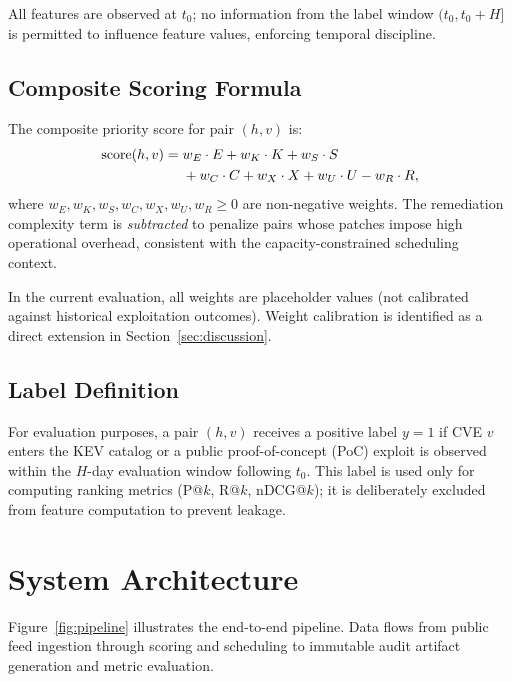\documentclass[journal]{IEEEtran}
\begin{document}
All features are observed at $t_0$; no information from the
label window $(t_0, t_0 + H]$ is permitted to influence feature
values, enforcing temporal discipline.

\subsection{Composite Scoring Formula}

The composite priority score for pair $(h,v)$ is:
\begin{align}
  \text{score}(h,v) =\;&
    w_E \cdot E + w_K \cdot K + w_S \cdot S \notag \\
    &+ w_C \cdot C + w_X \cdot X + w_U \cdot U - w_R \cdot R,
\label{eq:score}
\end{align}
where $w_E, w_K, w_S, w_C, w_X, w_U, w_R \geq 0$ are
non-negative weights.  The remediation complexity term is
\emph{subtracted} to penalize pairs whose patches impose high
operational overhead, consistent with the capacity-constrained
scheduling context.

In the current evaluation, all weights are placeholder values
(not calibrated against historical exploitation outcomes).
Weight calibration is identified as a direct extension in
Section~\ref{sec:discussion}.

\subsection{Label Definition}

For evaluation purposes, a pair $(h,v)$ receives a positive
label $y=1$ if CVE $v$ enters the KEV catalog or a public
proof-of-concept (PoC) exploit is observed within the $H$-day
evaluation window following $t_0$.  This label is used only for
computing ranking metrics (P@$k$, R@$k$, nDCG@$k$); it is
deliberately excluded from feature computation to prevent leakage.

\section{System Architecture}
\label{sec:architecture}

Figure~\ref{fig:pipeline} illustrates the end-to-end pipeline.
Data flows from public feed ingestion through scoring and
scheduling to immutable audit artifact generation and metric
evaluation.
\end{document}
